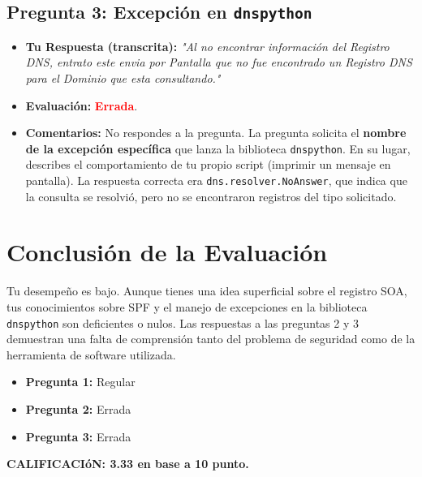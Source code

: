 \documentclass{article}
\begin{document}
\subsection*{Pregunta 3: Excepción en \texttt{dnspython}}
\begin{itemize}
    \item \textbf{Tu Respuesta (transcrita):} \textit{"Al no encontrar información del Registro DNS, 
    entrato este envia por Pantalla que no fue encontrado un Registro DNS para el Dominio que esta 
    consultando."}
    \item \textbf{Evaluación:} \textbf{\textcolor{red}{Errada}}.
    \item \textbf{Comentarios:} No respondes a la pregunta. La pregunta solicita el 
    \textbf{nombre de la excepción específica} que lanza la biblioteca \texttt{dnspython}. En su 
    lugar, describes el comportamiento de tu propio script (imprimir un mensaje en pantalla). 
    La respuesta correcta era \texttt{dns.resolver.NoAnswer}, que indica que la consulta se 
    resolvió, pero no se encontraron registros del tipo solicitado.
\end{itemize}

\section*{Conclusión de la Evaluación}

Tu desempeño es bajo. Aunque tienes una idea superficial sobre el registro SOA, 
tus conocimientos sobre SPF y el manejo de excepciones en la biblioteca \texttt{dnspython} 
son deficientes o nulos. Las respuestas a las preguntas 2 y 3 demuestran una falta de comprensión 
tanto del problema de seguridad como de la herramienta de software utilizada.

\begin{itemize}
    \item \textbf{Pregunta 1:} Regular
    \item \textbf{Pregunta 2:} Errada
    \item \textbf{Pregunta 3:} Errada
\end{itemize}

\textbf{CALIFICACIóN: 3.33 en base a 10 punto.}
\end{document}
